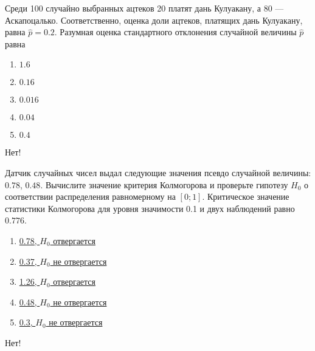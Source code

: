 \documentclass[t]{beamer}
\begin{document}
 \begin{frame} \label{28-No} 
\begin{block}{28} 

Среди 100 случайно выбранных ацтеков 20 платят дань Кулуакану, а 80 — Аскапоцалько. Соответственно, оценка доли ацтеков, платящих дань Кулуакану, равна $\hat{p}=0.2$. Разумная оценка стандартного отклонения случайной величины $\hat{p}$ равна
 


 \end{block} 
\begin{enumerate} 
\item[] \hyperlink{28-No}{\beamergotobutton{} $1.6$}
\item[] \hyperlink{28-No}{\beamergotobutton{} $0.16$}
\item[] \hyperlink{28-No}{\beamergotobutton{} $0.016$}
\item[] \hyperlink{28-Yes}{\beamergotobutton{} $0.04$}
\item[] \hyperlink{28-No}{\beamergotobutton{} $0.4$}
\end{enumerate} 

 \alert{Нет!} 
\end{frame} 


 \begin{frame} \label{29-No} 
\begin{block}{29} 

Датчик случайных чисел выдал следующие значения псевдо случайной величины: $0.78$, $0.48$. Вычислите значение критерия Колмогорова и проверьте гипотезу $H_0$ о соответствии распределения равномерному на $[0;1]$. Критическое значение статистики Колмогорова для уровня значимости 0.1 и двух наблюдений равно $0.776$.
 


 \end{block} 
\begin{enumerate} 
\item[] \hyperlink{29-No}{\beamergotobutton{} 0.78, $H_0$ отвергается}
\item[] \hyperlink{29-No}{\beamergotobutton{} 0.37, $H_0$ не отвергается}
\item[] \hyperlink{29-No}{\beamergotobutton{} 1.26, $H_0$ отвергается}
\item[] \hyperlink{29-Yes}{\beamergotobutton{} 0.48, $H_0$ не отвергается}
\item[] \hyperlink{29-No}{\beamergotobutton{} 0.3, $H_0$ не отвергается}
\end{enumerate} 

 \alert{Нет!} 
\end{frame} 
\end{document}
